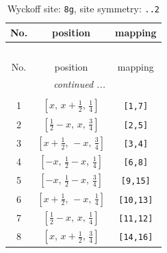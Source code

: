 \documentclass[fleqn,8pt]{jsarticle}
\begin{document}
\begin{longtable}{ccc}
\caption{Wyckoff site: {\tt 8g}, site symmetry: {\tt ..2}}
 \\
 \hline \hline
No. & position & mapping \\ \hline \endfirsthead

\multicolumn{2}{l}{\tablename\ \thetable{}} \\
 \hline \hline
No. & position & mapping \\ \hline \endhead

 \hline \hline
\multicolumn{2}{r}{\footnotesize\it continued ...} \\ \endfoot

 \hline \hline
\multicolumn{2}{r}{} \\ \endlastfoot

1 & $\left[ x,\, x + \frac{1}{2},\, \frac{1}{4} \right]$ & {\tt [1,7]} \\ \hline
2 & $\left[ \frac{1}{2} - x,\, x,\, \frac{3}{4} \right]$ & {\tt [2,5]} \\ \hline
3 & $\left[ x + \frac{1}{2},\, - x,\, \frac{3}{4} \right]$ & {\tt [3,4]} \\ \hline
4 & $\left[ - x,\, \frac{1}{2} - x,\, \frac{1}{4} \right]$ & {\tt [6,8]} \\ \hline
5 & $\left[ - x,\, \frac{1}{2} - x,\, \frac{3}{4} \right]$ & {\tt [9,15]} \\ \hline
6 & $\left[ x + \frac{1}{2},\, - x,\, \frac{1}{4} \right]$ & {\tt [10,13]} \\ \hline
7 & $\left[ \frac{1}{2} - x,\, x,\, \frac{1}{4} \right]$ & {\tt [11,12]} \\ \hline
8 & $\left[ x,\, x + \frac{1}{2},\, \frac{3}{4} \right]$ & {\tt [14,16]} \\
\end{longtable}
\renewcommand{\arraystretch}{1.2}
\end{document}
